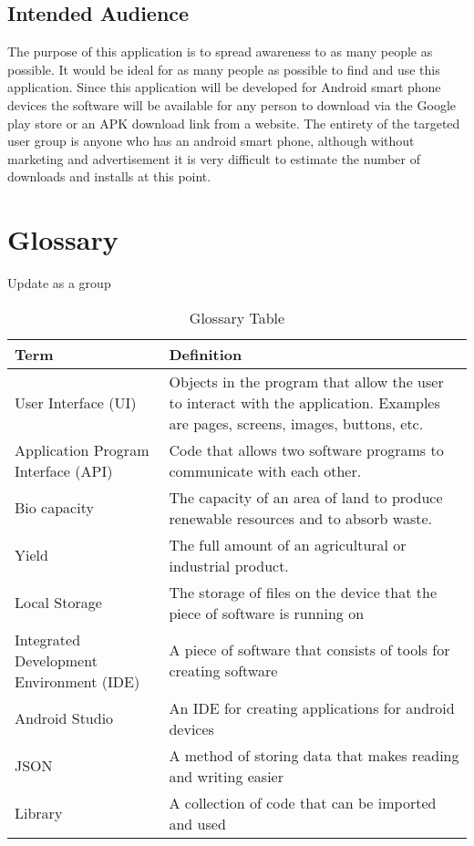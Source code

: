 \documentclass[onecolumn, draftclsnofoot,10pt, compsoc, tikz]{IEEEtran}
\begin{document}
\subsection{Intended Audience}
The purpose of this application is to spread awareness to as many people as possible. It would be ideal for as many people as possible to find and use this application. Since this application will be developed for Android smart phone devices the software will be available for any person to download via the Google play store or an APK download link from a website. The entirety of the targeted user group is anyone who has an android smart phone, although without marketing and advertisement it is very difficult to estimate the number of downloads and installs at this point.

\clearpage


\section{Glossary}

Update as a group

\begin{table}[h!]
\caption{Glossary Table}
\begin{center}
\begin{tabular}{ | m{6em} | m{9cm}| }
    \hline Term & Definition \\
    \hline User Interface (UI) & Objects in the program that allow the user to interact with the application. Examples are pages, screens, images, buttons, etc. \\
    \hline Application Program Interface (API) & Code that allows two software programs to communicate with each other. \\
    \hline Bio capacity & The capacity of an area of land to produce renewable resources and to absorb waste. \\
    \hline Yield & The full amount of an agricultural or industrial product. \\
    \hline Local Storage & The storage of files on the device that the piece of software is running on \\
    \hline Integrated Development Environment (IDE) & A piece of software that consists of tools for creating software \\
    \hline Android Studio & An IDE for creating applications for android devices \\
    \hline JSON & A method of storing data that makes reading and writing easier \\
    \hline Library & A collection of code that can be imported and used \\
    \hline
\end{tabular}
\end{center}
\end{table}
\end{document}
